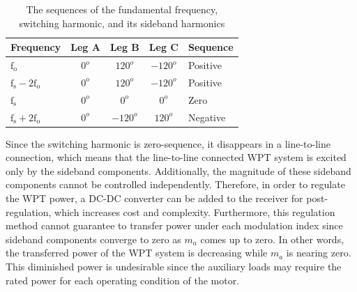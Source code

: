 \documentclass[journal]{IEEEtran}
\begin{document}
\begin{table}[h]
\centering
\caption{The sequences of the fundamental frequency, switching harmonic, and its sideband harmonics}
\begin{tabular}{l|cccl}
\textbf{Frequency}   & \textbf{Leg A   }        & \textbf{Leg B  }       & \textbf{Leg C}    & \textbf{Sequence} \\ \hline \hline
$\mathrm{f_o} $       &     $ 0^o $          & $ 120^o $        & $ -120^o $      & Positive      \\ 
$\mathrm{f_s-2f_o }$  &     $ 0^o $          & $ 120^o $        & $ -120^o $      &  Positive     \\ 
$\mathrm{f_s}  $      &     $ 0^o $          & $ 0^o $          &  $ 0^o $        &  Zero         \\ 
$\mathrm{f_s+2f_o} $  &     $ 0^o $          & $ -120^o $       &  $ 120^o $      & Negative       \\ 
\end{tabular}
\label{tab:zero_carrier_harmonics}
\end{table}

Since the switching harmonic is zero-sequence, it disappears in a line-to-line connection, which means that the line-to-line connected WPT system is excited only by the sideband components. 
Additionally, the magnitude of these sideband components cannot be controlled independently. 
Therefore, in order to regulate the WPT power, a DC-DC converter can be added to the receiver for post-regulation, which increases cost and complexity.
Furthermore, this regulation method cannot guarantee to transfer power under each modulation index since sideband components converge to zero as $m_a$ comes up to zero. 
In other words, the transferred power of the WPT system is decreasing while $m_a$ is nearing zero.
This diminished power is undesirable since the auxiliary loads may require the rated power for each operating condition of the motor. 
\vspace*{-4mm}
\end{document}
